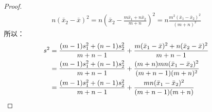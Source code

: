 \begin{proof}
\begin{gather*}
		n(\bar{x}_2-\bar{x})^2=n\left(\bar{x}_2-\frac{m\bar{x}_1+n\bar{x}_2}{m+n}\right)^2=n\frac{m^2(\bar{x}_1-\bar{x}_2)^2}{(m+n)^2}
	\end{gather*}
	所以：
	\begin{align*}
		s^2&=\frac{(m-1)s_1^2+(n-1)s_2^2}{m+n-1}+\frac{m(\bar{x}_1-\bar{x})^2+n(\bar{x}_2-\bar{x})^2}{m+n-1} \\
		&=\frac{(m-1)s_1^2+(n-1)s_2^2}{m+n-1}+\frac{(m+n)mn(\bar{x}_1-\bar{x}_2)^2}{(m+n-1)(m+n)^2} \\
		&=\frac{(m-1)s_1^2+(n-1)s_2^2}{m+n-1}+\frac{mn(\bar{x}_1-\bar{x}_2)^2}{(m+n-1)(m+n)}\qedhere
	\end{align*}
\end{proof}

